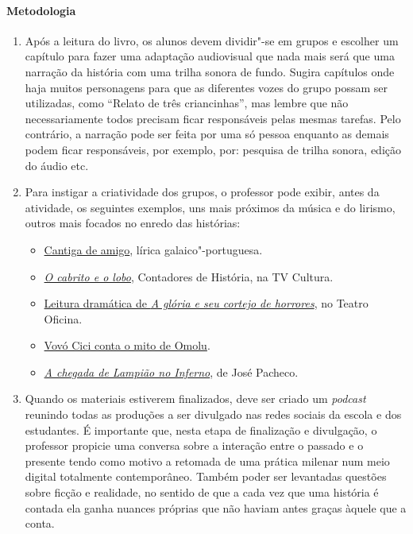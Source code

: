 \documentclass[12pt]{extarticle}
\begin{document}
 \paragraph{Metodologia}
 	\begin{enumerate}
 		\item
 		Após a leitura do livro, os alunos devem dividir"-se em grupos 
 		e escolher um capítulo para fazer uma adaptação audiovisual que nada
 		mais será que uma narração da história com uma trilha sonora de fundo. 
 		Sugira capítulos onde haja muitos personagens para que as diferentes vozes 
 		do grupo possam ser utilizadas, como ``Relato de três criancinhas'', mas
 		lembre que não necessariamente todos precisam ficar responsáveis pelas
 		mesmas tarefas. Pelo contrário, a narração pode ser feita por uma
 		só pessoa enquanto as demais podem ficar responsáveis, por exemplo,
 		por: pesquisa de trilha sonora, edição do áudio etc. 

 		\item
 		Para instigar a criatividade dos grupos, o professor pode exibir, antes
 		da atividade, os seguintes exemplos, uns mais próximos da música e do lirismo,
 		outros mais focados no enredo das histórias:
 		\begin{itemize}
 		\item\href{https://www.youtube.com/watch?v=1M_VcqHoQ1M}{Cantiga de amigo}, lírica
 		galaico"-portuguesa.
 		\item\href{https://www.youtube.com/watch?v=wLeI9KlGPq4}{\emph{O cabrito e o lobo}}, Contadores de História, na TV Cultura.
 		\item\href{https://www.youtube.com/watch?v=ZrqRLzsp9tA&t=1429s}{Leitura dramática de \emph{A glória
 		e seu cortejo de horrores}}, no Teatro Oficina.
 		\item\href{https://www.youtube.com/watch?v=MKLYfnAiIUE}{Vovó Cici conta o mito de Omolu}.
 		\item\href{https://www.youtube.com/watch?v=4ldSot7OLeU}{\emph{A chegada de Lampião no Inferno}}, de José Pacheco.
 	\end{itemize}
 		\item
 		Quando os materiais estiverem finalizados, deve ser criado um \textit{podcast} reunindo
 		todas as produções a ser divulgado nas redes sociais da escola e dos estudantes. 
 		É importante que, nesta etapa de finalização e divulgação, o professor propicie
 		uma conversa sobre a interação entre o passado e o presente tendo como motivo
 		a retomada de uma prática milenar num meio digital totalmente contemporâneo. 
 		Também poder ser levantadas questões sobre ficção e realidade, no sentido 
 		de que a cada vez que uma história é contada ela ganha nuances próprias
 		que não haviam antes graças àquele que a conta.
 	\end{enumerate}
\end{document}
